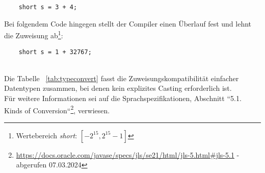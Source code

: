 \begin{verbatim}
    short s = 3 + 4;
\end{verbatim}

Bei folgendem Code hingegen stellt der Compiler einen Überlauf fest und lehnt die Zuweisung ab\footnote{Wertebereich \textit{short}: $[-2^{15}, 2^{15} -1]$}:

\begin{verbatim}
    short s = 1 + 32767;
\end{verbatim}\\

\noindent
Die Tabelle ~\ref{tab:typeconvert} fasst die Zuweisungskompatibilität einfacher Datentypen zusammen, bei denen kein explizites Casting erforderlich ist.\\
Für weitere Informationen sei auf die Sprachspezifikationen, Abschnitt ``5.1. Kinds of Conversion``\footnote{
    \url{https://docs.oracle.com/javase/specs/jls/se21/html/jls-5.html#jls-5.1} - abgerufen 07.03.2024
}, verwiesen.


